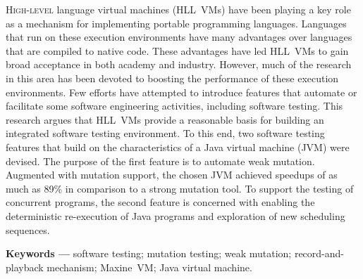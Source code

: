 
\lettrine{H}{igh-level} language virtual machines (HLL~VMs) have been playing a 
key role as a mechanism for implementing portable programming languages. 
Languages that run on these execution environments have many advantages over languages that are compiled to native code. 
These advantages have led HLL~VMs to gain broad acceptance in both academy and industry. 
However, 
much of the research in this area has been devoted to boosting the 
performance of these execution environments. 
Few efforts have attempted to introduce features that automate or 
facilitate some software engineering activities, 
including software testing. 
This research argues that 
HLL~VMs provide a reasonable basis for building an integrated software testing environment. 
To this end, 
two software testing features that build on the characteristics of  
a Java virtual machine (JVM) were devised. 
The purpose of the first feature is to automate weak mutation. 
Augmented with mutation support, 
the chosen JVM achieved speedups of as much as 89\% in comparison to a strong mutation tool. 
To support the testing of concurrent programs, 
the second feature is concerned with enabling the deterministic re-execution of Java programs and 
exploration of new scheduling sequences.

\smallskip
\noindent \textbf{Keywords ---} software testing; mutation testing; weak mutation; record-and-playback mechanism; Maxine~VM; Java virtual machine.


